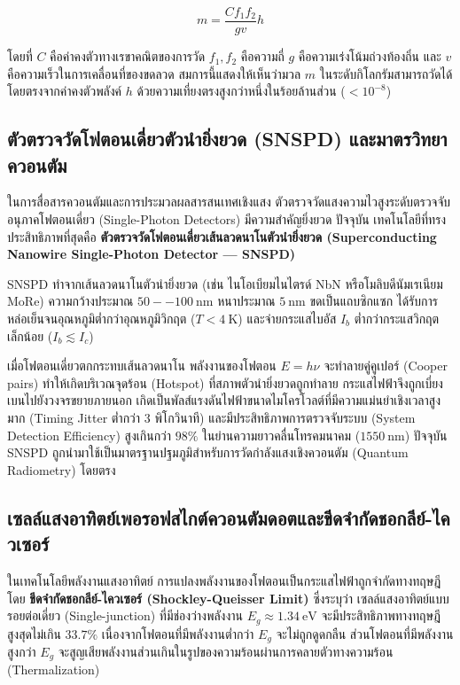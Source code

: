 \begin{equation}
m = \frac{C f_1 f_2}{g v} h
\label{eq:kibble_balance_equation}
\end{equation}

โดยที่ $C$ คือค่าคงตัวทางเรขาคณิตของการวัด $f_1, f_2$ คือความถี่ $g$ คือความเร่งโน้มถ่วงท้องถิ่น และ $v$ คือความเร็วในการเคลื่อนที่ของขดลวด สมการนี้แสดงให้เห็นว่ามวล $m$ ในระดับกิโลกรัมสามารถวัดได้โดยตรงจากค่าคงตัวพลังค์ $h$ ด้วยความเที่ยงตรงสูงกว่าหนึ่งในร้อยล้านส่วน ($< 10^{-8}$)

\subsection{ตัวตรวจวัดโฟตอนเดี่ยวตัวนำยิ่งยวด (SNSPD) และมาตรวิทยาควอนตัม}

ในการสื่อสารควอนตัมและการประมวลผลสารสนเทศเชิงแสง ตัวตรวจวัดแสงความไวสูงระดับตรวจจับอนุภาคโฟตอนเดี่ยว (Single-Photon Detectors) มีความสำคัญยิ่งยวด ปัจจุบัน เทคโนโลยีที่ทรงประสิทธิภาพที่สุดคือ \textbf{ตัวตรวจวัดโฟตอนเดี่ยวเส้นลวดนาโนตัวนำยิ่งยวด (Superconducting Nanowire Single-Photon Detector --- SNSPD)} 

SNSPD ทำจากเส้นลวดนาโนตัวนำยิ่งยวด (เช่น ไนโอเบียมไนไตรด์ NbN หรือโมลิบดีนัมเรเนียม MoRe) ความกว้างประมาณ $50--100~\text{nm}$ หนาประมาณ $5~\text{nm}$ ขดเป็นแถบซิกแซก ได้รับการหล่อเย็นจนอุณหภูมิต่ำกว่าอุณหภูมิวิกฤต ($T < 4~\text{K}$) และจ่ายกระแสไบอัส $I_b$ ต่ำกว่ากระแสวิกฤตเล็กน้อย ($I_b \lesssim I_c$)

เมื่อโฟตอนเดี่ยวตกกระทบเส้นลวดนาโน พลังงานของโฟตอน $E = h\nu$ จะทำลายคู่คูเปอร์ (Cooper pairs) ทำให้เกิดบริเวณจุดร้อน (Hotspot) ที่สภาพตัวนำยิ่งยวดถูกทำลาย กระแสไฟฟ้าจึงถูกเบี่ยงเบนไปยังวงจรขยายภายนอก เกิดเป็นพัลส์แรงดันไฟฟ้าขนาดไมโครโวลต์ที่มีความแม่นยำเชิงเวลาสูงมาก (Timing Jitter ต่ำกว่า 3 พิโกวินาที) และมีประสิทธิภาพการตรวจจับระบบ (System Detection Efficiency) สูงเกินกว่า $98\%$ ในย่านความยาวคลื่นโทรคมนาคม ($1550~\text{nm}$) ปัจจุบัน SNSPD ถูกนำมาใช้เป็นมาตรฐานปฐมภูมิสำหรับการวัดกำลังแสงเชิงควอนตัม (Quantum Radiometry) โดยตรง

\subsection{เซลล์แสงอาทิตย์เพอรอฟสไกต์ควอนตัมดอตและขีดจำกัดชอกลีย์-ไควเซอร์}

ในเทคโนโลยีพลังงานแสงอาทิตย์ การแปลงพลังงานของโฟตอนเป็นกระแสไฟฟ้าถูกจำกัดทางทฤษฎีโดย \textbf{ขีดจำกัดชอกลีย์-ไควเซอร์ (Shockley-Queisser Limit)} ซึ่งระบุว่า เซลล์แสงอาทิตย์แบบรอยต่อเดี่ยว (Single-junction) ที่มีช่องว่างพลังงาน $E_g \approx 1.34~\text{eV}$ จะมีประสิทธิภาพทางทฤษฎีสูงสุดไม่เกิน $33.7\%$ เนื่องจากโฟตอนที่มีพลังงานต่ำกว่า $E_g$ จะไม่ถูกดูดกลืน ส่วนโฟตอนที่มีพลังงานสูงกว่า $E_g$ จะสูญเสียพลังงานส่วนเกินในรูปของความร้อนผ่านการคลายตัวทางความร้อน (Thermalization)

